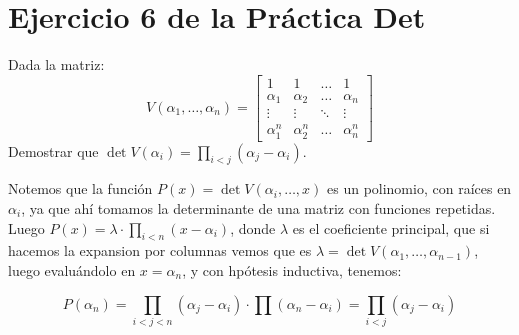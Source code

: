 \documentclass{article}
\begin{document}
\section*{Ejercicio 6 de la Práctica Det}
Dada la matriz:
\[
	V(\alpha_1, \dots, \alpha_n) = 
	\begin{bmatrix}
		1 & 1 & \dots & 1 \\
		\alpha_1 & \alpha_2 & \dots & \alpha_n \\
		\vdots & \vdots & \ddots & \vdots \\
		\alpha_1^n & \alpha_2^n & \dots & \alpha_n^n
	\end{bmatrix}
\]
Demostrar que $\det V(\alpha_i) = \prod_{i < j} (\alpha_j - \alpha_i)$.

Notemos que la función $P(x) = \det V (\alpha_i, \dots,  x)$ es un polinomio, con raíces en $\alpha_i$, ya que ahí tomamos la determinante de una matriz con funciones repetidas. Luego $P(x) = \lambda \cdot \prod_{i < n} (x - \alpha_i)$, donde $\lambda$ es el coeficiente principal, que si hacemos la expansion por columnas vemos que es $\lambda = \det V(\alpha_1, \dots, \alpha_{n-1})$, luego evaluándolo en $x = \alpha_n$, y con hpótesis inductiva, tenemos:

\[P(\alpha_n) = \prod_{i < j < n} (\alpha_j - \alpha_i) \cdot \prod (\alpha_n - \alpha_i) = \prod_{i < j} (\alpha_j - \alpha_i)\]
\end{document}
